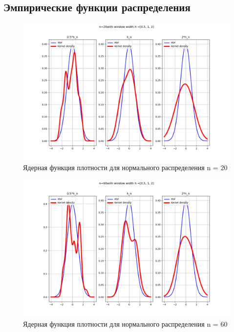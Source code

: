 \documentclass[a4]{article}
\begin{document}
\subsection{Эмпирические функции распределения}
\begin{center}

\begin{figure}[H]
\caption{Ядерная функция плотности для нормального распределения n = $20$ }
\includegraphics[width=\textwidth]{normal_pdf_20.png}
\end{figure}

\begin{figure}[H]
	\caption{Ядерная функция плотности для нормального распределения n = $60$ }
	\includegraphics[width=\textwidth]{normal_pdf_60.png}
\end{figure}


\end{center}
\end{document}
